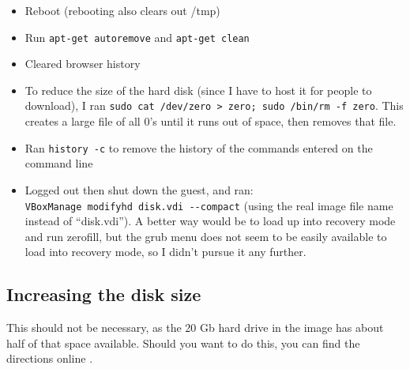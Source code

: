 \begin{itemize}
\tightlist
\item
  Reboot (rebooting also clears out /tmp)
\item
  Run \texttt{apt-get\ autoremove} and \texttt{apt-get\ clean}
\item
  Cleared browser history
\item
  To reduce the size of the hard disk (since I have to host it for
  people to download), I ran
  \texttt{sudo\ cat\ /dev/zero\ \textgreater{}\ zero;\ sudo\ /bin/rm\ -f\ zero}.
  This creates a large file of all 0's until it runs out of space, then
  removes that file.
\item
  Ran \texttt{history\ -c} to remove the history of the commands entered
  on the command line
\item
  Logged out then shut down the guest, and ran:
  \texttt{VBoxManage\ modifyhd\ disk.vdi\ -\/-compact} (using the real
  image file name instead of ``disk.vdi''). A better way would be to
  load up into recovery mode and run zerofill, but the grub menu does
  not seem to be easily available to load into recovery mode, so I
  didn't pursue it any further.
\end{itemize}

\subsection*{Increasing the disk size}

This should not be necessary, as the 20 Gb hard drive in the image has
about half of that space available.  Should you want to do this, you
can find the directions online
.
